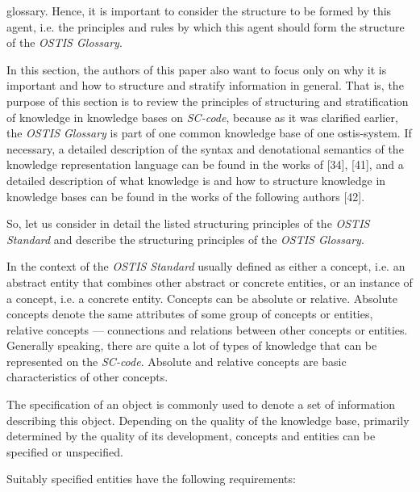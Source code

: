\documentclass{scndocument}
\begin{document}
\begin{multicols}{2}
\noindent glossary. Hence, it is important to consider the structure to be formed by this agent, i.e. the principles and rules by which this agent should form the structure of the \textit{OSTIS Glossary}.

In this section, the authors of this paper also want to focus only on why it is important and how to structure and stratify information in general. That is, the purpose of this section is to review the principles of structuring
and stratification of knowledge in knowledge bases on \textit{SC-code},  because as it was clarified earlier, the \textit{OSTIS Glossary} is part of one common knowledge base of one ostis-system. If necessary, a detailed description of the syntax and denotational semantics of the knowledge
representation language can be found in the works of [34], [41], and a detailed description of what knowledge is and how to structure knowledge in knowledge bases can be found in the works of the following authors [42].

So, let us consider in detail the listed structuring principles of the \textit{OSTIS Standard} and describe the structuring principles of the \textit{OSTIS Glossary}.

In the context of the \textit{OSTIS Standard} usually defined as either a concept, i.e. an abstract entity that combines other abstract or concrete entities, or an instance of a concept, i.e. a concrete entity. Concepts
can be absolute or relative. Absolute concepts denote the same attributes of some group of concepts or entities, relative concepts — connections and relations between other concepts or entities. Generally speaking, there are
quite a lot of types of knowledge that can be represented on the \textit{SC-code}.  Absolute and relative concepts are basic characteristics of other concepts.

The specification of an object is commonly used to denote a set of information describing this object. Depending on the quality of the knowledge base, primarily determined by the quality of its development, concepts and entities can be specified or unspecified.

Suitably specified entities have the following requirements: 


\end{multicols}
\end{document}
